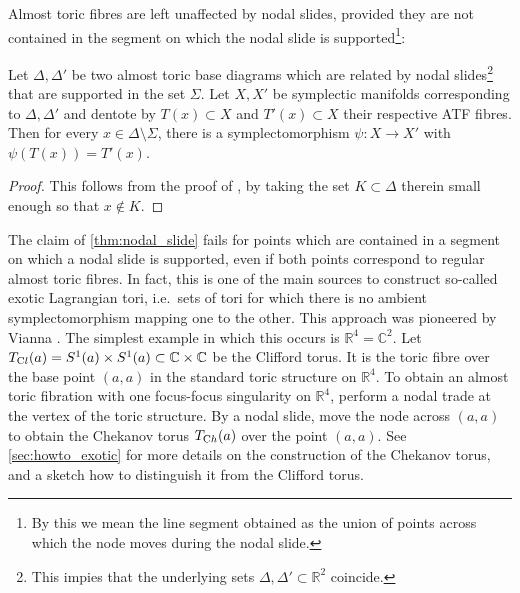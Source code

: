 \documentclass[12pt,a4paper,draft]{scrartcl}
\begin{document}
Almost toric fibres are left unaffected by nodal slides, provided they are not contained in the segment on which the nodal slide is supported\footnote{By this we mean the line segment obtained as the union of points across which the node moves during the nodal slide.}:

\begin{lemma}
    \label{thm:nodal_slide}
    Let $\Delta, \Delta'$ be two almost toric base diagrams which are related by nodal slides\footnote{This impies that the underlying sets $\Delta, \Delta' \subset \mathbb{R}^2$ coincide.} that are supported in the set $\Sigma$.
Let $X,X'$ be symplectic manifolds corresponding to $\Delta,\Delta'$ and dentote by $T(x) \subset X$ and $T'(x) \subset X$ their respective ATF fibres.
Then for every $x \in \Delta \setminus \Sigma$, there is a symplectomorphism $\psi \colon X \rightarrow X'$ with $\psi(T(x)) = T'(x)$.
\end{lemma}

\begin{proof}
    This follows from the proof of \cite[Theorem 8.10]{evans2021atfs}, by taking the set $K \subset \Delta$ therein small enough so that $x \notin K$.
\end{proof}

\begin{remark}
    \label{rk:slides_ray}
    The claim of \cref{thm:nodal_slide} fails for points which are contained in a segment on which a nodal slide is supported, even if both points correspond to regular almost toric fibres.
In fact, this is one of the main sources to construct so-called exotic Lagrangian tori, i.e.\ sets of tori for which there is no ambient symplectomorphism mapping one to the other.
This approach was pioneered by Vianna \cite{Via16,Via17}.
The simplest example in which this occurs is $\mathbb{R}^4 = \mathbb{C}^2$.
Let $T_{\text Cl}(a) = S^1(a) \times S^1(a) \subset \mathbb{C} \times \mathbb{C}$ be the Clifford torus.
It is the toric fibre over the base point $(a,a)$ in the standard toric structure on $\mathbb{R}^4$.
To obtain an almost toric fibration with one focus-focus singularity on $\mathbb{R}^4$, perform a nodal trade at the vertex of the toric structure.
By a nodal slide, move the node across $(a,a)$ to obtain the Chekanov torus $T_{\text Ch}(a)$ over the point $(a,a)$.
See \cref{sec:howto_exotic} for more details on the construction of the Chekanov torus, and a sketch how to distinguish it from the Clifford torus.
\end{remark}
\end{document}
